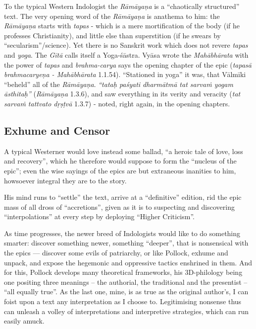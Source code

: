 To the typical Western Indologist the {\sl Rāmāyaṇa} is a ``chaotically structured'' text. The very opening word of the {\sl Rāmāyaṇa} is anathema to him: the {\sl Rāmāyaṇa} starts with {\sl tapas} -  which is a mere mortification of the body (if he professes Christianity), and little else than superstition (if he swears by ``secularism''/science). Yet there is no Sanskrit work which does not revere {\sl tapas} and {\sl yoga}. The {\sl Gītā} calls itself a Yoga-śāstra. Vyāsa wrote the {\sl Mahābhārata} with the power of {\sl tapas} and {\sl brahma-carya} says the opening chapter of the epic ({\sl tapasā brahmacaryeṇa  - Mahābhārata} 1.1.54). ``Stationed in yoga'' it was, that Vālmīki  ``beheld'' all of the {\sl Rāmāyaṇa}. {\sl ``tataḥ paśyati dharmātmā tat sarvaṁ yogam āsthitaḥ''} ({\sl Rāmāyaṇa} 1.3.6), and saw everything in its verity and veracity ({\sl tat sarvaṁ tattvato dṛṣṭvā} 1.3.7) - noted, right again, in the opening chapters.\\[-18pt]

\subsection*{Exhume and Censor}

A typical Westerner would love instead some ballad, ``a heroic tale of love, loss and recovery'', which he therefore would suppose to form the ``nucleus of the epic''; even the wise sayings of the epics are but extraneous inanities to him, howsoever integral they are to the story.

His mind runs to “settle” the text, arrive at a “definitive” edition, rid the epic mass of all dross of  “accretions”, given as it is to suspecting and discovering “interpolations” at every step by deploying “Higher Criticism”.

As time progresses, the newer breed of Indologists would like to do something smarter: discover something newer, something “deeper”, that is nonsensical with the epics --- discover some evils of patriarchy, or like Pollock, exhume and unpack, and expose the hegemonic and oppressive tactics enshrined in them. And for this, Pollock develops many theoretical frameworks, his 3D-philology being one positing three meanings -- the authorial, the traditional and the presentist -- “all equally true”. As the last one, mine, is as true as the original author's, I can foist upon a text any interpretation as I choose to. Legitimising nonsense thus can unleash a volley of interpretations and interpretive strategies, which can run easily amuck.

